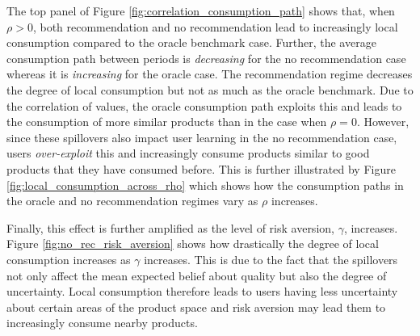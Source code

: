 \documentclass[sigconf]{acmart}
\begin{document}
The top panel of Figure \ref{fig:correlation_consumption_path} shows that, when $\rho > 0$, both recommendation and no recommendation lead to increasingly local consumption compared to the oracle benchmark case. Further, the average consumption path between periods is \textit{decreasing} for the no recommendation case whereas it is \textit{increasing} for the oracle case. The recommendation regime decreases the degree of local consumption but not as much as the oracle benchmark. Due to the correlation of values, the oracle consumption path exploits this and leads to the consumption of more similar products than in the case when $\rho = 0$. However, since these spillovers also impact user learning in the no recommendation case, users \textit{over-exploit} this and increasingly consume products similar to good products that they have consumed before. This is further illustrated by Figure \ref{fig:local_consumption_across_rho} which shows how the consumption paths in the oracle and no recommendation regimes vary as $\rho$ increases.
\par

Finally, this effect is further amplified as the level of risk aversion, $\gamma$, increases. Figure \ref{fig:no_rec_risk_aversion} shows how drastically the degree of local consumption increases as $\gamma$ increases. This is due to the fact that the spillovers not only affect the mean expected belief about quality but also the degree of uncertainty. Local consumption therefore leads to users having less uncertainty about certain areas of the product space and risk aversion may lead them to increasingly consume nearby products.
\end{document}
